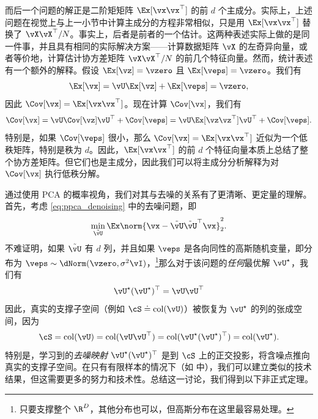 \documentclass[../../book-main_zh.tex]{subfiles}
\begin{document}
而后一个问题的解正是二阶矩矩阵 \(\Ex[\vx\vx^{\top}]\) 的前 \(d\)
个主成分。实际上，上述问题在视觉上与上一小节中计算主成分的方程非常相似，只是用 \(\Ex[\vx\vx^{\top}]\) 替换了
\(\vX\vX^{\top}/N\)。事实上，后者是前者的一个估计。这两种表述实际上做的是同一件事，并且具有相同的实际解决方案——计算数据矩阵
\(\vX\) 的左奇异向量，或者等价地，计算估计协方差矩阵 \(\vX\vX^{\top}/N\)
的前几个特征向量。然而，统计表述有一个额外的解释。假设 \(\Ex[\vz] = \vzero\) 且 \(\Ex[\veps] =
\vzero\)。我们有
\begin{equation}
    \Ex[\vx] = \vU\Ex[\vz] + \Ex[\veps] = \vzero,
\end{equation}
因此 \(\Cov[\vx] = \Ex[\vx\vx^{\top}]\)。现在计算 \(\Cov[\vx]\)，我们有
\begin{equation}
    \Cov[\vx] = \vU\Cov[\vz]\vU^{\top} + \Cov[\veps] =
    \vU\Ex[\vz\vz^{\top}]\vU^{\top} + \Cov[\veps].
\end{equation}
特别是，如果 \(\Cov[\veps]\) 很小，那么 \(\Cov[\vx]
= \Ex[\vx\vx^{\top}]\) 近似为一个低秩矩阵，特别是秩为
\(d\)。因此，\(\Ex[\vx\vx^{\top}]\) 的前 \(d\)
个特征向量本质上总结了整个协方差矩阵。但它们也是主成分，因此我们可以将主成分分析解释为对 \(\Cov[\vx]\) 执行低秩分解。

\begin{remark}
    通过使用 PCA 的概率视角，我们对其与去噪的关系有了更清晰、更定量的理解。首先，考虑
    \eqref{eq:ppca_denoising} 中的去噪问题，即
    \begin{equation}
        \min_{\tilde{\vU}}\Ex\norm{\vx -
        \tilde{\vU}\tilde{\vU}^{\top}\vx}_{2}^{2}.
    \end{equation}
    不难证明，如果 $\tilde{\vU}$ 有 $d$ 列，并且如果 \(\veps\) 是各向同性的高斯随机变量，即分布为
    \(\veps \sim \dNorm(\vzero,
    \sigma^{2}\vI)\)，\footnote{只要支撑整个
    \(\R^{D}\)，其他分布也可以，但高斯分布在这里最容易处理。}那么对于该问题的\textit{任何}最优解 \(\vU^{\star}\)，我们有
    \begin{equation}
        \vU^{\star}(\vU^{\star})^{\top} = \vU\vU^{\top}
    \end{equation}
    因此，真实的支撑子空间（例如 \(\cS \doteq
    \mathop{\mathrm{col}}(\vU)\)）被恢复为 \(\vU^{\star}\) 的列的张成空间，因为
    \begin{equation}
        \cS = \mathop{\mathrm{col}}(\vU) = \mathop{\mathrm{col}}(\vU\vU^{\top})
        = \mathop{\mathrm{col}}(\vU^{\star}(\vU^{\star})^{\top})
        = \mathop{\mathrm{col}}(\vU^{\star}).
    \end{equation}
    特别是，学习到的\textit{去噪映射} \(\vU^{\star}(\vU^{\star})^{\top}\) 是到
    \(\cS\) 上的正交投影，将含噪点推向真实的支撑子空间。在只有有限样本的情况下（如 
    中），我们可以建立类似的技术结果，但这需要更多的努力和技术性。总结这一讨论，我们得到以下非正式定理。
\end{remark}
\end{document}
